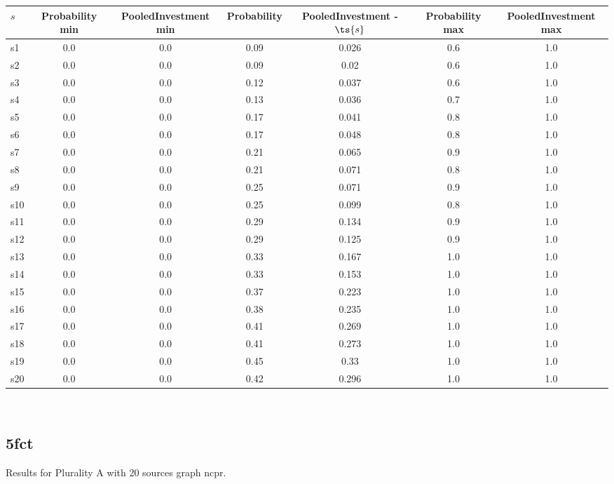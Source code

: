 \documentclass{article}
\begin{document}
\noindent\begin{tabular}{|l|c|c|c|c|c|c|}
\hline
$s$& Probability min & PooledInvestment min & Probability & PooledInvestment - $\ts{s}$ & Probability max & PooledInvestment max\\
\hline
s1 &0.0 & 0.0 & 0.09 & 0.026 & 0.6 & 1.0\\
\hline
s2 &0.0 & 0.0 & 0.09 & 0.02 & 0.6 & 1.0\\
\hline
s3 &0.0 & 0.0 & 0.12 & 0.037 & 0.6 & 1.0\\
\hline
s4 &0.0 & 0.0 & 0.13 & 0.036 & 0.7 & 1.0\\
\hline
s5 &0.0 & 0.0 & 0.17 & 0.041 & 0.8 & 1.0\\
\hline
s6 &0.0 & 0.0 & 0.17 & 0.048 & 0.8 & 1.0\\
\hline
s7 &0.0 & 0.0 & 0.21 & 0.065 & 0.9 & 1.0\\
\hline
s8 &0.0 & 0.0 & 0.21 & 0.071 & 0.8 & 1.0\\
\hline
s9 &0.0 & 0.0 & 0.25 & 0.071 & 0.9 & 1.0\\
\hline
s10 &0.0 & 0.0 & 0.25 & 0.099 & 0.8 & 1.0\\
\hline
s11 &0.0 & 0.0 & 0.29 & 0.134 & 0.9 & 1.0\\
\hline
s12 &0.0 & 0.0 & 0.29 & 0.125 & 0.9 & 1.0\\
\hline
s13 &0.0 & 0.0 & 0.33 & 0.167 & 1.0 & 1.0\\
\hline
s14 &0.0 & 0.0 & 0.33 & 0.153 & 1.0 & 1.0\\
\hline
s15 &0.0 & 0.0 & 0.37 & 0.223 & 1.0 & 1.0\\
\hline
s16 &0.0 & 0.0 & 0.38 & 0.235 & 1.0 & 1.0\\
\hline
s17 &0.0 & 0.0 & 0.41 & 0.269 & 1.0 & 1.0\\
\hline
s18 &0.0 & 0.0 & 0.41 & 0.273 & 1.0 & 1.0\\
\hline
s19 &0.0 & 0.0 & 0.45 & 0.33 & 1.0 & 1.0\\
\hline
s20 &0.0 & 0.0 & 0.42 & 0.296 & 1.0 & 1.0\\
\hline
\end{tabular}\\

\newpage

\subsection{5fct}

\noindent Results for Plurality A with 20 sources graph ncpr.
\end{document}
